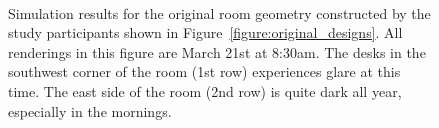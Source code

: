 \begin{figure}[t]
\vspace{-2.04in}
\begin{minipage}{1.1in}~{\color{white}{\bf ground-truth}}\end{minipage} \hfill
\begin{minipage}{1.1in}~{\color{white}{\bf A1}}\end{minipage} \hfill
\begin{minipage}{1.1in}~{\color{white}{\bf A4}}\end{minipage} \hfill
%
\begin{minipage}{1.1in}~{\color{white}{\bf N1}}\end{minipage} \hfill
\begin{minipage}{1.1in}~{\color{white}{\bf N2}}\end{minipage} \hfill
\begin{minipage}{1.1in}~{\color{white}{\bf N6}}\end{minipage}
\vspace{1.67in}

\caption{ Simulation results for the original room geometry
  constructed by the study participants shown in
  Figure~\ref{figure:original_designs}. 
All renderings in this figure are March 21st
  at 8:30am.  The desks in the southwest corner of the room (1st row)
  experiences glare at this time.  The east side of the room (2nd row)
  is quite dark all year, especially in the mornings.  }
\vspace{-0.1in}
\label{figure:renderingsOfOriginalGeometry}
\end{figure}
